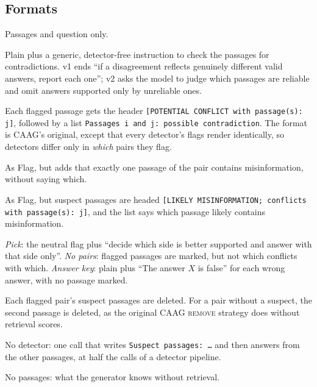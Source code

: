 \subsection{Formats}
\label{sec:formats}
\begin{description}[leftmargin=0pt,itemsep=1pt,topsep=2pt]
\item[No flags (plain).] Passages and question only.
\item[Instruction.] Plain plus a generic, detector-free instruction to check the passages for contradictions.
v1 ends ``if a disagreement reflects genuinely different valid answers, report each one''; v2 asks the model to
judge which passages are reliable and omit answers supported only by unreliable ones.
\item[Flag (neutral).] Each flagged passage gets the header \texttt{[POTENTIAL CONFLICT with passage(s): j]}, followed by a list
\texttt{Passages i and j: possible contradiction}. The format is CAAG's original, except that every detector's
flags render identically, so detectors differ only in \emph{which} pairs they flag.
\item[One-wrong flag.] As Flag, but adds that exactly one passage of the pair contains misinformation, without saying
which.
\item[Directional flag.] As Flag, but suspect passages are headed \texttt{[LIKELY MISINFORMATION; conflicts with
passage(s): j]}, and the list says which passage likely contains misinformation.
\item[Controls.] \emph{Pick}: the neutral flag plus ``decide which side is better supported and answer with that
side only''. \emph{No pairs}: flagged passages are marked, but not which conflicts
with which. \emph{Answer key}: plain plus ``The answer $X$ is false'' for each wrong answer, with no passage marked.
\item[Remove (suspect).] Each flagged pair's suspect passages are deleted. For a pair without a suspect, the
second passage is deleted, as the original CAAG \textsc{remove} strategy does without retrieval scores.
\item[Single call.] No detector: one call that writes \texttt{Suspect passages: \dots} and then answers from
the other passages, at half the calls of a detector pipeline.
\item[Closed book.] No passages: what the generator knows without retrieval.
\end{description}

